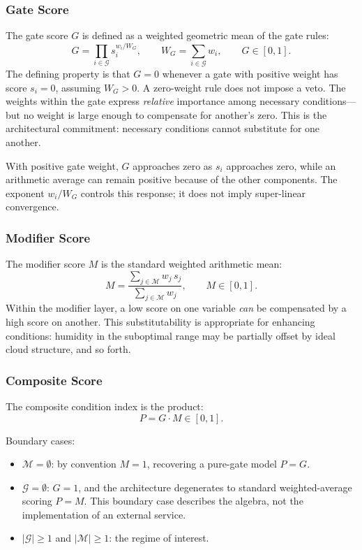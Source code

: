 \documentclass[11pt,a4paper]{article}
\begin{document}
\subsubsection{Gate Score}

The gate score $G$ is defined as a weighted geometric mean of the gate rules:
\begin{equation}
G = \prod_{i \in \mathcal{G}} s_i^{w_i / W_G}, \qquad W_G = \sum_{i \in \mathcal{G}} w_i, \qquad G \in [0, 1].
\label{eq:gate}
\end{equation}
The defining property is that $G = 0$ whenever a gate with positive weight has score $s_i = 0$, assuming $W_G > 0$. A zero-weight rule does not impose a veto. The weights within the gate express \emph{relative} importance among necessary conditions---but no weight is large enough to compensate for another's zero. This is the architectural commitment: necessary conditions cannot substitute for one another.

With positive gate weight, $G$ approaches zero as $s_i$ approaches zero, while an arithmetic average can remain positive because of the other components. The exponent $w_i/W_G$ controls this response; it does not imply super-linear convergence.

\subsubsection{Modifier Score}

The modifier score $M$ is the standard weighted arithmetic mean:
\begin{equation}
M = \frac{\sum_{j \in \mathcal{M}} w_j \, s_j}{\sum_{j \in \mathcal{M}} w_j}, \qquad M \in [0, 1].
\label{eq:modifier}
\end{equation}
Within the modifier layer, a low score on one variable \emph{can} be compensated by a high score on another. This substitutability is appropriate for enhancing conditions: humidity in the suboptimal range may be partially offset by ideal cloud structure, and so forth.

\subsubsection{Composite Score}

The composite condition index is the product:
\begin{equation}
P = G \cdot M \in [0, 1].
\label{eq:composite}
\end{equation}

Boundary cases:
\begin{itemize}
\item $\mathcal{M} = \emptyset$: by convention $M = 1$, recovering a pure-gate model $P = G$.
\item $\mathcal{G} = \emptyset$: $G = 1$, and the architecture degenerates to standard weighted-average scoring $P = M$. This boundary case describes the algebra, not the implementation of an external service.
\item $|\mathcal{G}| \geq 1$ and $|\mathcal{M}| \geq 1$: the regime of interest.
\end{itemize}
\end{document}
